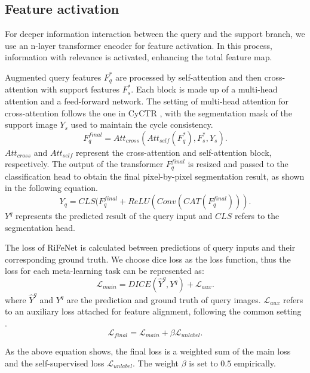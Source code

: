\documentclass[letterpaper]{article} %
\begin{document}
\subsection{Feature activation}
For deeper information interaction between the query and the support branch, we use an n-layer transformer encoder for feature activation. In this process, information with relevance is activated, enhancing the total feature map.

Augmented query features $F^{*}_q$ are processed by self-attention and then cross-attention with support features $F^{*}_s$. Each block is made up of a multi-head attention and a feed-forward network. The setting of multi-head attention for cross-attention follows the one in CyCTR \cite{zhang2021few}, with the segmentation mask of the support image $Y_s$ used to maintain the cycle consistency.
\begin{equation}
	F^{final}_q = Att_{cross}(Att_{self}(F^{*}_q),F^{*}_s,Y_s).
\end{equation}%
$Att_{cross}$ and $Att_{self}$ represent the cross-attention and self-attention block, respectively. The output of the transformer $F^{final}_q$ is resized and passed to the classification head to obtain the final pixel-by-pixel segmentation result, as shown in the following equation.
\begin{equation}
	Y_q = CLS(F^{final}_q+ReLU(Conv(CAT(F^{final}_q))).
\end{equation}%
$Y^q$ represents the predicted result of the query input and $CLS$ refers to the segmentation head.

The loss of RiFeNet is calculated between predictions of query inputs and their corresponding ground truth. We choose dice loss as the loss function, thus the loss for each meta-learning task can be represented as:
\begin{equation}
            \mathcal{L}_{main} = DICE (\hat{Y}^q,Y^q) + \mathcal{L}_{aux}.
\end{equation}%
where $\hat{Y}^q$ and ${Y}^q$ are the prediction and ground truth of query images. $\mathcal{L}_{aux}$ refers to an auxiliary loss attached for feature alignment, following the common setting \cite{milletari2016v}.
\begin{equation}
            \mathcal{L}_{final} = \mathcal{L}_{main} + \beta \mathcal{L}_{unlabel}.
\end{equation}%

As the above equation shows, the final loss is a weighted sum of the main loss and the self-supervised loss $\mathcal{L}_{unlabel}$. The weight $\beta$ is set to $0.5$ empirically.
\end{document}
